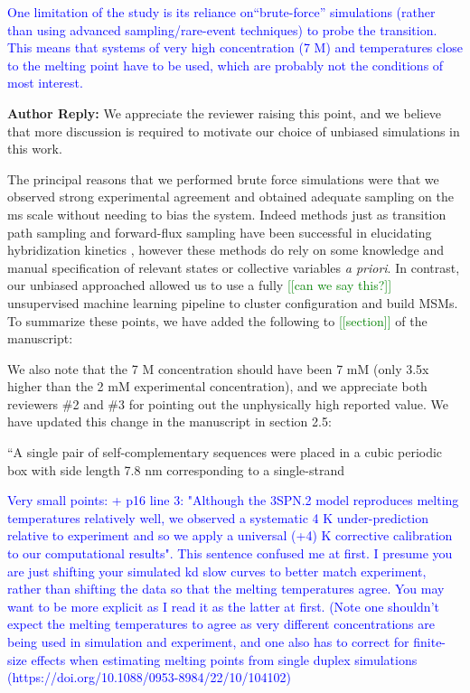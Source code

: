 \documentclass[11pt,a4paper]{letter} %
\newcommand*{\rood}[1]{{\color{red}{#1}}}
\newcommand*{\noteg}[1]{\textcolor{green}{[[#1]]}}		%
\begin{document}
\rood{update intro to focus on transition probabilities and not just states}

\textcolor{blue}{One limitation of the study is its reliance on``brute-force'' simulations (rather than using advanced sampling/rare-event techniques) to probe the transition. This means that systems of very high concentration (7 M) and temperatures close to the melting point have to be used, which are probably not the conditions of most interest.}

\textbf{Author Reply:}    We appreciate the reviewer raising this point, and we believe that more discussion is required to motivate our choice of unbiased simulations in this work. 

The principal reasons that we performed brute force simulations were that we observed strong experimental agreement and obtained adequate sampling on the ms scale without needing to bias the system.  Indeed methods just as transition path sampling and forward-flux sampling have been successful in elucidating hybridization kinetics \citep{Sambriski2009, Hinckley2014Coarse-grainedEffects, Jin2019}, however these methods do rely on some knowledge and manual specification of relevant states or collective variables \emph{a priori}. In contrast, our unbiased approached allowed us to use a fully \noteg{can we say this?} unsupervised machine learning pipeline to cluster configuration and build MSMs. To summarize these points, we have added the following to \noteg{section} of the manuscript:

\rood{``A couple sentences on why we chose unbiased simulation''}

We also note that the 7 M concentration should have been 7 mM (only 3.5x higher than the 2 mM experimental concentration), and we appreciate both reviewers \#2 and \#3 for pointing out the unphysically high reported value. We have updated this change in the manuscript in section 2.5:

``A single pair of self-complementary sequences were placed in a cubic periodic box with side length 7.8 nm corresponding to a single-strand \rood{concentration of 7 mMol/L.''}

\textcolor{blue}{Very small points:
+ p16 line 3: "Although the 3SPN.2 model reproduces melting temperatures relatively well, we observed a systematic 4 K under-prediction relative to experiment and so we apply a universal (+4) K corrective calibration to our computational results". This sentence confused me at first. I presume you are just shifting your simulated kd slow curves to better match experiment, rather than shifting the data so that the melting temperatures agree. You may want to be more explicit as I read it as the latter at first. (Note one shouldn't expect the melting temperatures to agree as very different concentrations are being used in simulation and experiment, and one also has to correct for finite-size effects when estimating melting points from single duplex simulations (https://doi.org/10.1088/0953-8984/22/10/104102)}
\end{document}
